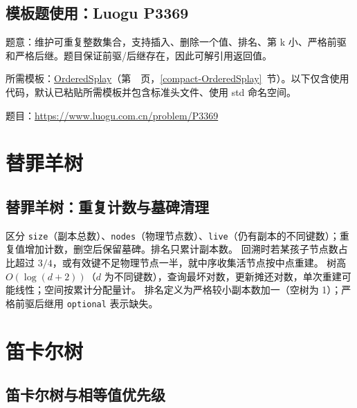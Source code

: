 

\Needspace{447pt}

\subsection*{模板题使用：Luogu P3369}

\label{usage-example-9}

题意：维护可重复整数集合，支持插入、删除一个值、排名、第 k 小、严格前驱和严格后继。题目保证前驱/后继存在，因此可解引用返回值。

所需模板：\hyperref[compact-OrderedSplay]{OrderedSplay}（第~\pageref{compact-OrderedSplay}~页，\ref{compact-OrderedSplay}~节）。以下仅含使用代码，默认已粘贴所需模板并包含标准头文件、使用 std 命名空间。

题目：\url{https://www.luogu.com.cn/problem/P3369}



\Needspace{180pt}

\section{替罪羊树}

\subsection{替罪羊树：重复计数与墓碑清理}\label{knowledge-scapegoat}
区分 \texttt{size}（副本总数）、\texttt{nodes}（物理节点数）、\texttt{live}（仍有副本的不同键数）；重复值增加计数，删空后保留墓碑。排名只累计副本数。
回溯时若某孩子节点数占比超过 $3/4$，或有效键不足物理节点一半，就中序收集活节点按中点重建。
树高 $O(\log(d+2))$（$d$ 为不同键数），查询最坏对数，更新摊还对数，单次重建可能线性；空间按累计分配量计。
排名定义为严格较小副本数加一（空树为 1）；严格前驱后继用 \texttt{optional} 表示缺失。


\Needspace{530pt}

\section{笛卡尔树}

\subsection{笛卡尔树与相等值优先级}\label{compact-CartesianTree}

